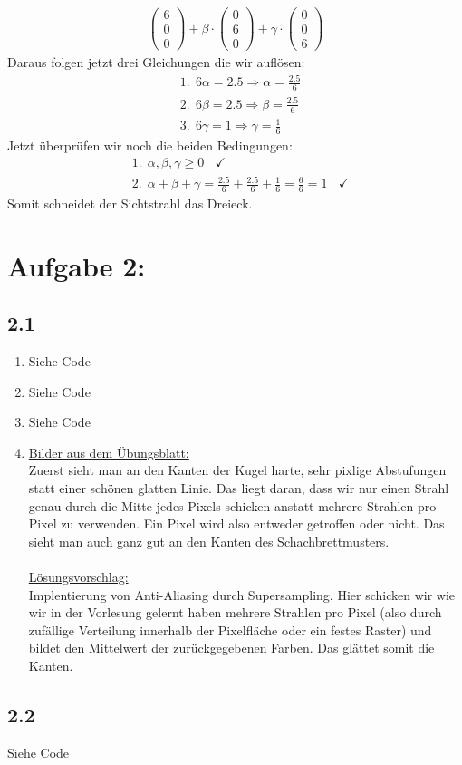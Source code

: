 \documentclass[11pt]{article}
\begin{document}
\begin{enumerate}
\begin{align*}
\begin{pmatrix*}
    6 \\
    0 \\
    0
  \end{pmatrix*} + \beta \cdot \begin{pmatrix*}
    0 \\
    6 \\
    0
  \end{pmatrix*} + \gamma \cdot \begin{pmatrix*}
    0 \\
    0 \\
    6
 \end{pmatrix*}
\end{align*}
Daraus folgen jetzt drei Gleichungen die wir auflösen: 
\begin{align*}
  &1.~~6\alpha =  2.5 \Rightarrow \alpha = \frac{2.5}{6} \\
  &2.~~6\beta  = 2.5 \Rightarrow \beta = \frac{2.5}{6} \\
  &3.~~6\gamma =  1 \Rightarrow \gamma = \frac{1}{6}
\end{align*}
Jetzt überprüfen wir noch die beiden Bedingungen:
\begin{align*}  
  &1.~~\alpha, \beta, \gamma \geq 0~~~~ \checkmark \\
  &2.~~\alpha + \beta + \gamma = \frac{2.5}{6} + \frac{2.5}{6} + \frac{1}{6} = \frac{6}{6} = 1~~~~ \checkmark
\end{align*}
Somit schneidet der Sichtstrahl das Dreieck.
\end{enumerate}

\section*{Aufgabe 2:}
\subsection*{2.1}
\begin{enumerate}
  \item Siehe Code
  \item Siehe Code
  \item Siehe Code
  \item \underline{Bilder aus dem Übungsblatt:} \\
  Zuerst sieht man an den Kanten der Kugel harte, sehr pixlige Abstufungen statt einer schönen glatten Linie. Das liegt daran, dass wir nur einen Strahl genau durch die Mitte jedes Pixels schicken anstatt mehrere Strahlen pro Pixel zu verwenden. Ein Pixel wird also entweder getroffen oder nicht. 
  Das sieht man auch ganz gut an den Kanten des Schachbrettmusters.  \\\\
  \underline{Lösungsvorschlag:} \\
  Implentierung von Anti-Aliasing durch Supersampling. Hier schicken wir wie wir in der Vorlesung gelernt haben mehrere Strahlen pro Pixel (also durch zufällige Verteilung innerhalb der Pixelfläche oder ein festes Raster) und bildet den Mittelwert der zurückgegebenen Farben. Das glättet somit die Kanten.
\end{enumerate}
\subsection*{2.2}
Siehe Code
\end{document}
